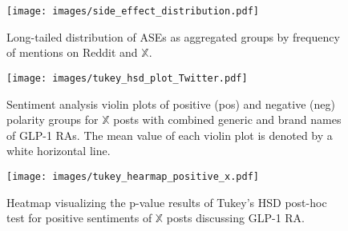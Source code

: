 \documentclass[referee,bst/sn-basic]{sn-jnl}%
\begin{document}
\begin{sidewaysfigure}
    \centering
    \texttt{[image: images/side\_effect\_distribution.pdf]}
    \caption{Long-tailed distribution of ASEs as aggregated groups by frequency of mentions on Reddit and $\mathbb{X}$.
             }
    \label{fig:ASE_mention}
\end{sidewaysfigure}



\begin{figure}[H]
    \centering
    \texttt{[image: images/tukey\_hsd\_plot\_Twitter.pdf]}
    \caption{Sentiment analysis violin plots of positive (pos) and negative (neg) polarity groups for $\mathbb{X}$ posts with combined generic and brand names of GLP-1 RAs.
             The mean value of each violin plot is denoted by a white horizontal line.}
    \label{fig:sentiment}
\end{figure}



 \begin{figure}[H]
    \centering
    \texttt{[image: images/tukey\_hearmap\_positive\_x.pdf]}
    \caption{Heatmap visualizing the p-value results of Tukey’s HSD post-hoc test for positive sentiments of $\mathbb{X}$ posts discussing GLP-1 RA.}
    \label{fig:heatmap_pos}
\end{figure}
\end{document}
